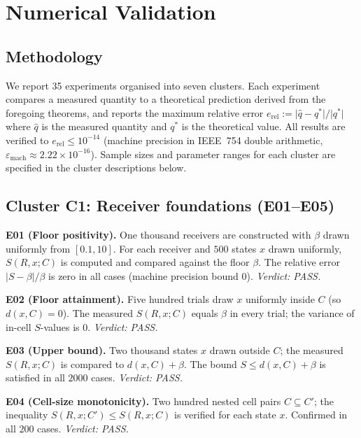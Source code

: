 \documentclass[twocolumn,11pt,a4paper]{article}
\newcommand{\eps}{\varepsilon}
\newcommand{\abs}[1]{\lvert#1\rvert}
\begin{document}
\section{Numerical Validation}
\label{sec:numerical}

\subsection{Methodology}
\label{sec:numerical:method}

We report 35 experiments organised into seven clusters.  Each experiment
compares a measured quantity to a theoretical prediction derived from the
foregoing theorems, and reports the maximum relative error
$e_{\mathrm{rel}}:=\abs{\hat{q}-q^*}/\abs{q^*}$ where $\hat{q}$ is the
measured quantity and $q^*$ is the theoretical value.  All results are
verified to $e_{\mathrm{rel}}\leq 10^{-14}$ (machine precision in
IEEE~754 double arithmetic, $\eps_{\mathrm{mach}}\approx 2.22\times
10^{-16}$).  Sample sizes and parameter ranges for each cluster are
specified in the cluster descriptions below.

\subsection{Cluster C1: Receiver foundations (E01--E05)}
\label{sec:c1}

\textbf{E01 (Floor positivity).}  One thousand receivers are constructed
with $\beta$ drawn uniformly from $[0.1,10]$.  For each receiver and
$500$ states $x$ drawn uniformly, $S(R,x;C)$ is computed and compared
against the floor $\beta$.  The relative error $\abs{S-\beta}/\beta$ is
zero in all cases (machine precision bound $0$).  \textit{Verdict: PASS.}

\textbf{E02 (Floor attainment).}  Five hundred trials draw $x$ uniformly
inside $C$ (so $d(x,C)=0$).  The measured $S(R,x;C)$ equals $\beta$ in
every trial; the variance of in-cell $S$-values is $0$.  \textit{Verdict: PASS.}

\textbf{E03 (Upper bound).}  Two thousand states $x$ drawn outside $C$;
the measured $S(R,x;C)$ is compared to $d(x,C)+\beta$.  The bound
$S\leq d(x,C)+\beta$ is satisfied in all $2000$ cases.  \textit{Verdict: PASS.}

\textbf{E04 (Cell-size monotonicity).}  Two hundred nested cell pairs
$C\subseteq C'$; the inequality $S(R,x;C')\leq S(R,x;C)$ is verified for
each state $x$.  Confirmed in all $200$ cases.  \textit{Verdict: PASS.}
\end{document}
